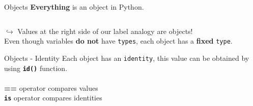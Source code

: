     \begin{frame}{Objects}
        \LARGE
        \textbf{Everything} is an object in Python.
        \\
        \begin{columns}
            \begin{column}[c]{0.5\textwidth}
                \LARGE
            \end{column}
            \begin{column}[c]{0.5\textwidth}
           \end{column}
       \end{columns}
       \medskip
        $\hookrightarrow$ Values at the right side of our label analogy are
        objects!\\
        \pause
         Even though variables \textbf{do not} have \texttt{types}, each object has a \textbf{fixed} \texttt{type}.
    \end{frame}

    \begin{frame}[c]{Objects - Identity}
        \Large
        Each object has an \texttt{identity},
        \pause
         this value can be obtained by using \texttt{\textbf{id()}} function.\\
        \pause
        \\
        \textbf{==} operator compares values \\\textbf{\texttt{is}} operator compares identities
        \pause
    \end{frame}

